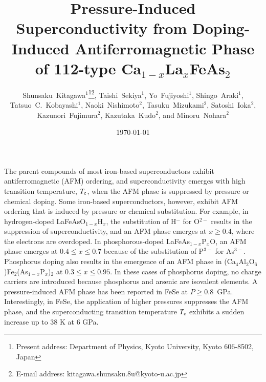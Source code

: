 \documentclass [letter,twocolumn]{jpsj3}
\title{
Pressure-Induced Superconductivity from Doping-Induced Antiferromagnetic Phase of 112-type Ca$_{1-x}$La$_{x}$FeAs$_{2}$
}
\author{
Shunsaku~Kitagawa$^{1}$\thanks{Present address: Department of Physics, Kyoto University, Kyoto 606-8502, Japan}\thanks{E-mail address: kitagawa.shunsaku.8u@kyoto-u.ac.jp}, 
Taishi~Sekiya$^{1}$, 
Yo~Fujiyoshi$^{1}$, 
Shingo~Araki$^{1}$, 
Tatsuo~C.~Kobayashi$^{1}$, 
Naoki~Nishimoto$^{2}$, 
Tasuku~Mizukami$^{2}$, 
Satoshi~Ioka$^{2}$, 
Kazunori~Fujimura$^{2}$, 
Kazutaka~Kudo$^{2}$, and
Minoru~Nohara$^{2}$
}
\date{\today}
\begin{document}
\clearpage
\maketitle

The parent compounds of most iron-based superconductors exhibit antiferromagnetic (AFM) ordering, and superconductivity emerges with high transition temperature, $T_{\rm c}$, when the AFM phase is suppressed by pressure or chemical doping. \cite{J.Paglione_Naturephys_2010}
Some iron-based superconductors, however, exhibit AFM ordering that is induced by pressure or chemical substitution. 
For example, in hydrogen-doped LaFeAsO$_{1-x}$H$_{x}$, the substitution of H$^{-}$ for O$^{2-}$ results in the suppression of superconductivity, and an AFM phase emerges at $x \geq 0.4$, where the electrons are overdoped. \cite{M.Hiraishi_NatPhys_2014,N.Fujiwara_PRL_2013}
In phosphorous-doped LaFeAs$_{1-x}$P$_{x}$O, an AFM phase emerges at $0.4 \leq x \leq 0.7$ because of the substitution of P$^{3-}$ for As$^{3-}$. \cite{S.Kitagawa_JPSJ_2014,K.T.Lai_PRB_2014,T.Shiota_JPSJ_2016,S.Miyasaka_PRB_2017}
Phosphorus doping also results in the emergence of an AFM phase in (Ca$_4$Al$_2$O$_6$)Fe$_2$(As$_{1-x}$P$_{x}$)$_2$ at $0.3 \leq x \leq 0.95$. \cite{H.Kinouchi_PRB_2013}
In these cases of phosphorus doping, no charge carriers are introduced because phosphorus and arsenic are isovalent elements. 
A pressure-induced AFM phase has been reported in FeSe at $P \geq 0.8$~GPa. \cite{M.Bendele_PRL_2010,M.Bendele_PRB_2012,K.Kothapalli_NatCommun_2016,P.S.Wang_PRL_2016}
Interestingly, in FeSe, the application of higher pressures suppresses the AFM phase, and the superconducting transition temperature $T_{\rm c}$ exhibits a sudden increase up to 38 K at 6 GPa. \cite{J.P.Sun_NatCommun_2016}
\end{document}
